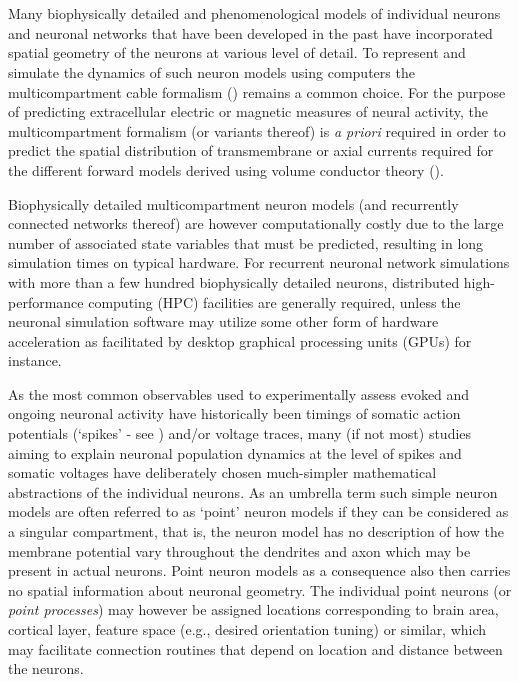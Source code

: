



\section{}
\label{sec:Schemes:HybridLFPy}


Many biophysically detailed and phenomenological models of individual neurons and neuronal networks that have been developed in the past have incorporated spatial geometry of the neurons at various level of detail. 
To represent and simulate the dynamics of such neuron models using computers the multicompartment cable formalism () remains a common choice. 
For the purpose of predicting extracellular electric or magnetic measures of neural activity, 
the multicompartment formalism (or variants thereof) is \emph{a priori} required in order to predict the spatial distribution of transmembrane or axial currents required for the different forward models derived using volume conductor theory (). 

Biophysically detailed multicompartment neuron models (and recurrently connected networks thereof) are however computationally costly due to the large number of associated state variables that must be predicted, 
resulting in long simulation times on typical hardware. 
For recurrent neuronal network simulations with more than a few hundred biophysically detailed neurons, distributed high-performance computing (HPC) facilities are generally required, 
unless the neuronal simulation software may utilize some other form of hardware acceleration as facilitated by desktop graphical processing units (GPUs) for instance.  

As the most common observables used to experimentally assess evoked and ongoing neuronal activity have historically been timings of somatic action potentials (`spikes' - see ) and/or voltage traces, 
many (if not most) studies aiming to explain neuronal population dynamics at the level of spikes and somatic voltages have deliberately chosen much-simpler mathematical abstractions of the individual neurons. 
As an umbrella term such simple neuron models are often referred to as `point' neuron models if they can be considered as a singular compartment,
that is, 
the neuron model has no description of how the membrane potential vary throughout the dendrites and axon which may be present in actual neurons. 
Point neuron models as a consequence also then carries no spatial information about neuronal geometry.
The individual point neurons (or \emph{point processes}) may however be assigned locations corresponding to brain area, cortical layer, feature space (e.g., desired orientation tuning) or similar, 
which may facilitate connection routines that depend on location and distance between the neurons. 

